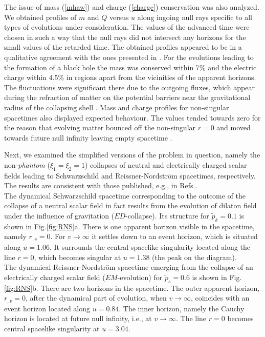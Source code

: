 \documentclass[aps,showpacs,nofootinbib,floatfix]{revtex4}
\newcommand{\tpe}{{\tilde p}}
\begin{document}
The issue of mass (\ref{mhaw}) and charge (\ref{charge}) conservation was also analyzed. We obtained 
profiles of $m$ and $Q$ versus $u$ along ingoing null rays specific to all types of evolutions 
under consideration. The values of the advanced time were chosen in such a way that the null 
rays did not intersect any horizons for the small values of the retarded time. The obtained 
profiles appeared to be in a qualitative agreement with the ones presented in \cite{bor11}. For the evolutions 
leading to the formation of a black hole the mass was conserved within $7\%$ and the electric charge 
within $4.5\%$ in regions apart from the vicinities of the apparent horizons. The fluctuations were 
significant there due to the outgoing fluxes, which appear during the refraction of matter on the potential 
barriers near the gravitational radius of the collapsing shell \cite{ore03}. Mass and charge 
profiles for non-singular spacetimes also displayed expected behaviour. The values tended 
towards zero for the reason that evolving matter bounced off the 
non-singular $r=0$ and moved towards future null infinity leaving empty spacetime \cite{ham96}.

Next, we examined the simplified versions of the problem in question, namely the non-{\it phantom} 
($\xi_1=\xi_2=1$) collapses of 
neutral and electrically charged scalar fields leading to Schwarzschild and 
Reissner-Nordstr\"{o}m spacetimes, respectively. 
The results are consistent with those published, e.g., in Refs.\cite{ham96,hod98,ore03}.\\
The dynamical Schwarzschild spacetime corresponding to the outcome of the collapse of a neutral scalar field \cite{ham96} in fact results from the evolution of dilaton field under the influence of gravitation ($ED$-collapse). 
Its structure for $\tpe_k=0.1$ is shown in Fig.\ref{fig:RNS}a. There is one apparent horizon visible in the spacetime, namely $r_{,v}=0$. For $v\rightarrow\infty$ it settles down to an event horizon, which is situated along $u=1.06$. It surrounds the central spacelike singularity located along the line $r=0$, which becomes singular at $u=1.38$ (the peak on the diagram).\\
The dynamical Reissner-Nordstr\"{o}m spacetime emerging from the collapse of an electrically charged scalar field ($EM$-evolution) \cite{ore03} for $\tpe_s=0.6$ is shown in Fig.\ref{fig:RNS}b. There are two horizons in the spacetime. 
The outer apparent horizon, $r_{,v}=0$, after the dynamical part of evolution, when 
$v\rightarrow\infty$, coincides with an event horizon located along $u=0.84$. 
The inner horizon, namely the Cauchy horizon is located at future null infinity, i.e., at $v\rightarrow\infty$. The 
line $r=0$ becomes central spacelike singularity at $u=3.04$.
\end{document}
